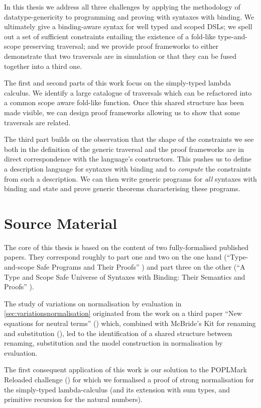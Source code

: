 In this thesis we address all three challenges by applying the methodology of
datatype-genericity to programming and proving with syntaxes with binding.
We ultimately give a binding-aware syntax for well typed and scoped DSLs; we
spell out a set of sufficient constraints entailing the existence of a fold-like
type-and-scope preserving traversal; and we provide proof frameworks
to either demonstrate that two traversals are in simulation or that they can be
fused together into a third one.

The first and second parts of this work focus on the simply-typed lambda calculus.
We identify a large catalogue of traversals which can be refactored into a common
scope aware fold-like function. Once this shared structure has been made
visible, we can design proof frameworks allowing us to show that some traversals
are related.

The third part builds on the observation that the shape of the constraints we
see both in the definition of the generic traversal and the proof frameworks
are in direct correspondence with the language's constructors. This pushes us
to define a description language for syntaxes with binding and to \emph{compute}
the constraints from such a description. We can then write generic programs for
\emph{all} syntaxes with binding and state and prove generic theorems characterising
these programs.

\section{Source Material}

The core of this thesis is based on the content of two fully-formalised
published papers. They
correspond roughly to part one and two on the one hand
(``Type-and-scope Safe Programs and Their Proofs'' \cite{allais2017type, repo2017})
and part three on the other
(``A Type and Scope Safe Universe of Syntaxes with Binding: Their Semantics and Proofs''
\cite{generic-syntax, repo2018}).

The study of variations on normalisation by evaluation in \cref{sec:variationsnormalisation}
originated from the work on a third paper ``New equations for neutral terms''
(\cite{new-equations}) which, combined with McBride's Kit for renaming and substitution
(\citeyear{mcbride2005type}), led to the identification of a shared structure between renaming,
substitution and the model construction in normalisation by evaluation.

The first consequent application of this work is our solution to the
POPLMark Reloaded challenge
(\cite{poplmarkreloaded, poplmark2}) for which we formalised a proof of
strong normalisation for the simply-typed lambda-calculus (and its extension
with sum types, and primitive recursion for the natural numbers).


